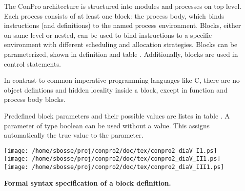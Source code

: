 \documentclass[a4paper,12pt,twoside,english]{article}
\begin{document}
\def\thesubsubsection{\vrule width 0pt height 1.3 ex}

\def\thesubsection{\tocXIII}
\secII{\label{toclabelXIII}\thesubsection}
The ConPro architecture is structured into modules and processes on top level. Each process consists
of at least one block: the process body, which binds instructions (and definitions) to the named process environment. Blocks, either on same level or nested,
can be used to bind instructions to a specific environment with different scheduling and allocation strategies. Blocks can be parameterized, shown in definition
 and table . Additionally, blocks are used in control statements. 


\vskip5pt
In contrast to common imperative programming languages like C, there are no object defintions and hidden locality inside a block, except in function and process
body blocks.


\vskip5pt
Predefined block parameters and their possible values are listes in table . A parameter of type boolean can be used without a value. This assigns
automatically the true value to the parameter.


\vskip5pt
\def\defcontent{
\begin{center}
\texttt{[image: /home/sbosse/proj/conpro2/doc/tex/conpro2\_diaV\_I1.ps]}\\\vskip3pt
\texttt{[image: /home/sbosse/proj/conpro2/doc/tex/conpro2\_diaV\_II1.ps]}\\\vskip3pt
\texttt{[image: /home/sbosse/proj/conpro2/doc/tex/conpro2\_diaV\_III1.ps]}\\\vskip3pt
\end{center}
}
\def\defdescription{
\caption{\bf Formal syntax specification of  a block definition.
}
\label{def:5}}

\begin{definition}
\let\normalsize\footnotesize \normalsize
\defcontent
\defdescription

\end{definition}
\end{document}

